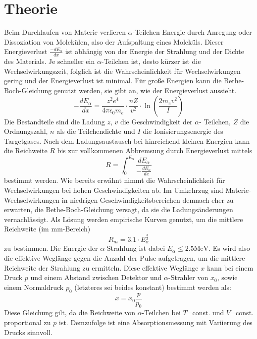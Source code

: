 \section{Theorie}
\label{sec:Theorie}

Beim Durchlaufen von Materie verlieren $\alpha$-Teilchen Energie durch Anregung 
oder Dissoziation von Molekülen, also der Aufspaltung eines Moleküls. Dieser 
Energieverlust $\frac{-dE_{\alpha}}{dx}$ ist abhängig von der Energie der 
Strahlung und der Dichte des Materials. Je schneller ein $\alpha$-Teilchen ist, 
desto kürzer ist die Wechselwirkungszeit, folglich ist die Wahrscheinlichkeit 
für Wechselwirkungen gering und der Energieverlust ist minimal. Für große 
Energien kann die Bethe-Boch-Gleichung genutzt werden, sie gibt an, wie der 
Energieverlust aussieht.
\begin{equation}
    \label{eqn:1}
    -\frac{dE_\alpha}{dx} = \frac{z^2 e^4}{4 \pi \epsilon_0 m_e} \cdot 
                           \frac{n Z}{v^2} \cdot \ln\left(\frac{2 m_e v^2}{I}\right)
\end{equation}
Die Bestandteile sind die Ladung $z$, $v$ die Geschwindigkeit der $\alpha$-
Teilchen, $Z$ die Ordnungszahl, $n$ als die Teilchendichte und $I$ die 
Ionisierungsenergie des Targetgases. Nach dem Ladungsaustausch bei hinreichend
kleinen Energien kann die Reichweite $R$ bis zur vollkommenen Abbremsung durch 
Energieverlust mittels 
\begin{equation}
    \label{eqn:2}
    R = \int_0^{E_\alpha} \frac{dE_{\alpha}}{-\frac{dE_\alpha}{dx}}
\end{equation}
bestimmt werden. Wie bereits erwähnt nimmt die Wahrscheinlichkeit für 
Wechselwirkungen bei hohen Geschwindigkeiten ab. Im Umkehrzug sind Materie-
Wechselwirkungen in niedrigen Geschwindigkeitsbereichen demnach eher zu erwarten, 
die Bethe-Boch-Gleichung versagt, da sie die Ladungsänderungen vernachlässigt.
Als Lösung werden empirische Kurven genutzt, um die mittlere Reichweite (im 
$\unit{\milli\meter}$-Bereich)
\begin{equation}
    \label{eqn:3}
    R_m = 3.1 \cdot E_{\alpha}^{\frac{3}{2}}
\end{equation}
zu bestimmen. Die Energie der $\alpha$-Strahlung ist dabei $E_{\alpha} \leq 
2.5 \unit{\mega\eV}$. Es wird also die effektive Weglänge gegen die Anzahl der 
Pulse aufgetragen, um die mittlere Reichweite der Strahlung zu ermitteln.
Diese effektive Weglänge $x$ kann bei einem Druck $p$ und einem Abstand zwischen 
Detektor und $\alpha$-Strahler von $x_0$, sowie einem Normaldruck $p_0$ (letzteres 
sei beides konstant) bestimmt werden als:
\begin{equation}
    \label{eqn:4}
    x = x_0 \frac{p}{p_0}
\end{equation}
Diese Gleichung gilt, da die Reichweite von $\alpha$-Teilchen bei $T$=const. und 
$V$=const. proportional zu $p$ ist. Demzufolge ist eine Absorptionsmessung mit 
Variierung des Drucks sinnvoll.